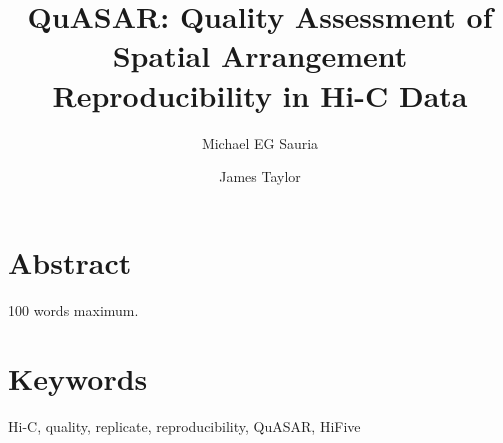 \documentclass[letterpaper,11pt,english]{article}
\title{QuASAR: Quality Assessment of Spatial Arrangement Reproducibility in Hi-C Data}
\author[1]{Michael EG Sauria}
\author[1]{James Taylor}
\affil[1]{Departments of Biology and Computer Science, Johns Hopkins University}
\begin{document}
\maketitle

\section{Abstract}

100 words maximum.

\section{Keywords}
Hi-C, quality, replicate, reproducibility, QuASAR, HiFive


\end{document}
